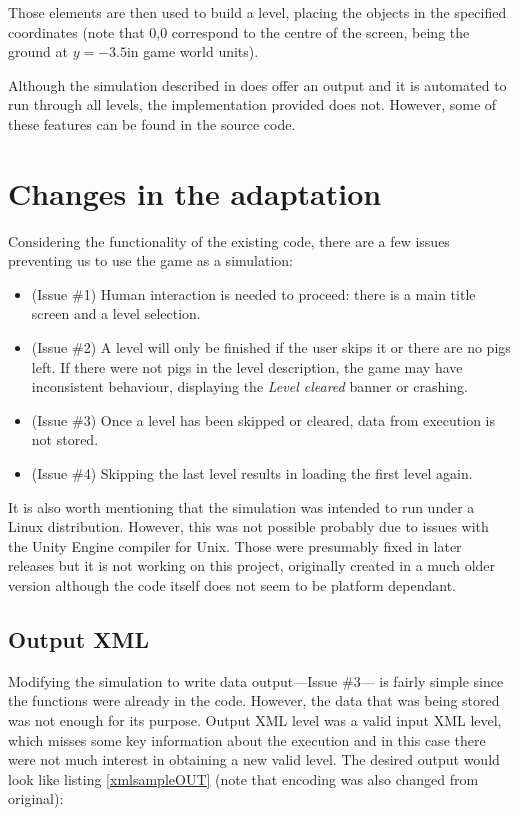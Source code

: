 Those elements are then used to build a level, placing the objects in the specified coordinates (note that 0,0 correspond to the centre of the screen, being the ground at $y=-3.5$in game world units).

Although the simulation described in \cite{ferreira2014search} does offer an output and it is automated to run through all levels, the implementation provided does not. However, some of these features can be found in the source code.

\section{Changes in the adaptation}
Considering the functionality of the existing code, there are a few issues preventing us to use the game as a simulation:

\begin{itemize}
	\item (Issue \#1) Human interaction is needed to proceed: there is a main title screen and a level selection.
	\item (Issue \#2) A level will only be finished if the user skips it or there are no pigs left. If there were not pigs in the level description, the game may have inconsistent behaviour, displaying the \textit{Level cleared} banner or crashing.
	\item (Issue \#3) Once a level has been skipped or cleared, data from execution is not stored.
	\item (Issue \#4) Skipping the last level results in loading the first level again. 
\end{itemize}

It is also worth mentioning that the simulation was intended to run under a Linux distribution. However, this was not possible probably due to issues with the Unity Engine compiler for Unix. Those were presumably fixed in later releases but it is not working on this project, originally created in a much older version although the code itself does not seem to be platform dependant.


\subsection{Output XML}

Modifying the simulation to write data output---Issue \#3--- is fairly simple since the functions were already in the code. However, the data that was being stored was not enough for its purpose. Output XML level was a valid input XML level, which misses some key information about the execution and in this case there were not much interest in obtaining a new valid level. The desired output would look like listing \ref{xmlsampleOUT} (note that encoding was also changed from original):

